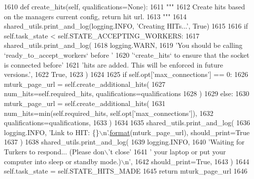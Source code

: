 \begin{DoxyCode}
1610     \textcolor{keyword}{def }create\_hits(self, qualifications=None):
1611         \textcolor{stringliteral}{"""}
1612 \textcolor{stringliteral}{        Create hits based on the managers current config, return hit url.}
1613 \textcolor{stringliteral}{        """}
1614         shared\_utils.print\_and\_log(logging.INFO, \textcolor{stringliteral}{'Creating HITs...'}, \textcolor{keyword}{True})
1615 
1616         \textcolor{keywordflow}{if} self.task\_state < self.STATE\_ACCEPTING\_WORKERS:
1617             shared\_utils.print\_and\_log(
1618                 logging.WARN,
1619                 \textcolor{stringliteral}{'You should be calling `ready\_to\_accept\_workers` before '}
1620                 \textcolor{stringliteral}{'`create\_hits` to ensure that the socket is connected before'}
1621                 \textcolor{stringliteral}{'hits are added. This will be enforced in future versions.'},
1622                 \textcolor{keyword}{True},
1623             )
1624 
1625         \textcolor{keywordflow}{if} self.opt[\textcolor{stringliteral}{'max\_connections'}] == 0:
1626             mturk\_page\_url = self.create\_additional\_hits(
1627                 num\_hits=self.required\_hits, qualifications=qualifications
1628             )
1629         \textcolor{keywordflow}{else}:
1630             mturk\_page\_url = self.create\_additional\_hits(
1631                 num\_hits=min(self.required\_hits, self.opt[\textcolor{stringliteral}{'max\_connections'}]),
1632                 qualifications=qualifications,
1633             )
1634 
1635         shared\_utils.print\_and\_log(
1636             logging.INFO, \textcolor{stringliteral}{'Link to HIT: \{\}\(\backslash\)n'}.\hyperlink{namespaceparlai_1_1chat__service_1_1services_1_1messenger_1_1shared__utils_a32e2e2022b824fbaf80c747160b52a76}{format}(mturk\_page\_url), should\_print=\textcolor{keyword}{True}
1637         )
1638         shared\_utils.print\_and\_log(
1639             logging.INFO,
1640             \textcolor{stringliteral}{'Waiting for Turkers to respond... (Please don\(\backslash\)'t close'}
1641             \textcolor{stringliteral}{' your laptop or put your computer into sleep or standby mode.)\(\backslash\)n'},
1642             should\_print=\textcolor{keyword}{True},
1643         )
1644         self.task\_state = self.STATE\_HITS\_MADE
1645         \textcolor{keywordflow}{return} mturk\_page\_url
1646 
\end{DoxyCode}
\mbox{\label{classparlai_1_1mturk_1_1core_1_1dev_1_1mturk__manager_1_1MTurkManager_a2eb341bf9b3791d0c502592445816775}} 
